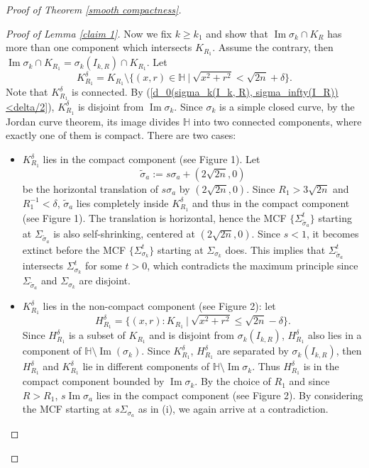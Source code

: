 \documentclass[12pt]{amsart}
\numberwithin{equation}{section}
\theoremstyle{remark}
\begin{document}
\begin{proof} [Proof of Theorem \ref{smooth compactness}]
\begin{proof} [Proof of Lemma \ref{claim 1}]
			Now we fix $k\ge k_1$ and show that $\operatorname{Im}\sigma_k\cap K_R$ has more than one component which intersects $K_{R_1}$. Assume the contrary, then $ \operatorname{Im}\sigma_k\cap K_{R_1} = \sigma_k (I_{k, R})\cap K_{R_1}$. Let 
			$$K_{R_1}^\delta = K_{R_1} \setminus \{ (x, r)\in \mathbb 
			H\ |\ \sqrt{x^2+r^2} < \sqrt{2n}+\delta\}. $$
			Note that $K_{R_1}^\delta$ is connected. By (\ref{d_0(sigma_k(I_k, R), sigma_infty(I_R)) <delta/2}), $K^\delta_{R_1}$ is disjoint from $\operatorname{Im}\sigma_k$. Since $\sigma_k$ is a simple closed curve, by the Jordan curve theorem, its image divides $\mathbb H$ into two connected components, where exactly one of them is compact. There are two cases: 
			\begin{itemize}
				\item [(i)] $K_{R_1}^\delta$ lies in the compact component (see Figure 1). Let 
				$$\tilde\sigma_ a:= s\sigma_a + (2\sqrt{2n},0)$$ 
				be the horizontal translation of $s\sigma_a$ by $(2\sqrt{2n}, 0)$. Since $R_1 > 3\sqrt{2n}$ and $R^{-1}_1 < \delta$, $\tilde\sigma_ a$ lies completely inside $K_{R_1}^\delta$ and thus in the compact component (see Figure 1). The translation is horizontal, hence the MCF $\{ \Sigma^t_{\tilde\sigma_ a}\}$ starting at $\Sigma_{\tilde \sigma_a}$ is also self-shrinking, centered at $(2\sqrt{2n},0)$. Since $s<1$, it becomes extinct before the MCF $\{\Sigma^t_{\sigma_k}\}$ starting at $\Sigma_{\sigma_k}$ does. This implies that $\Sigma^{t}_{\tilde \sigma_a}$ intersects $\Sigma^t_{\sigma_k}$ for some $t>0$, which contradicts the maximum principle since $\Sigma_{\tilde \sigma_a}$ and $\Sigma_{\sigma_k}$ are disjoint. 
				
				
				\item [(ii)] $K_{R_1}^\delta$ lies in the non-compact component (see Figure 2): let 
				$$H_{R_1}^\delta = \{ (x, r) :K_{R_1}\ |\  \sqrt{x^2+r^2}\le \sqrt{2n}-\delta\}.$$
				Since $ H_{R_1}^\delta$ is a subset of $K_{R_1}$ and is disjoint from $\sigma_k (I_{k, R})$, $H^\delta_{R_1}$ also lies in a component of $\mathbb H\setminus \operatorname{Im}(\sigma_k)$. Since $K^\delta_{R_1}$, $H^\delta_{R_1}$ are separated by $\sigma_k (I_{k, R})$, then $H^\delta_{R_1}$ and $K_{R_1}^\delta$ lie in different components of $\mathbb H \setminus  \operatorname{Im}\sigma_k$. Thus $H^\delta_{R_1}$ is in the compact component bounded by $\operatorname{Im}\sigma_k$. By the choice of $R_1$ and since $R>R_1$, $s\operatorname{Im}\sigma_a$ lies in the compact component (see Figure 2). By considering the MCF starting at $s\Sigma_{\sigma_a}$ as in (i), we again arrive at a contradiction. 
			\end{itemize}
			

\end{proof}
\end{proof}
\end{document}

